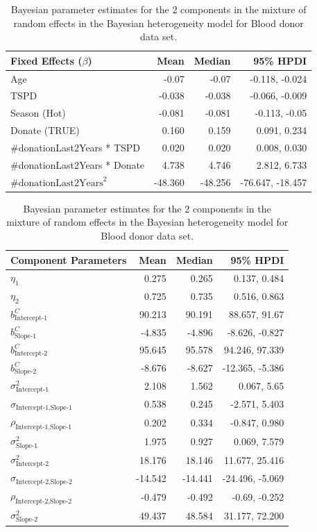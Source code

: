 \begin{table}[!htb]
\centering
\captionsetup{justification=centering}
\caption{Bayesian parameter estimates for the 2 components in the mixture of random effects in the Bayesian heterogeneity model for Blood donor data set.}
\label{table : bhtge_blooddonor_2comp}
\begin{tabular}{@{}lrrr@{}}
\toprule
Fixed Effects ($\beta$) & Mean & Median & 95\% HPDI \\ \midrule
Age &  -0.07 & -0.07 & -0.118, -0.024\\
TSPD & -0.038 & -0.038 & -0.066, -0.009\\
Season (Hot) & -0.081 & -0.081 & -0.113, -0.05\\
Donate (TRUE) & 0.160 & 0.159 & 0.091, 0.234\\
\#donationLast2Years * TSPD & 0.020 & 0.020 & 0.008, 0.030\\
\#donationLast2Years * Donate & 4.738 & 4.746 & 2.812, 6.733\\
$\text{\#donationLast2Years}^2$  & -48.360 & -48.256 & -76.647, -18.457\\ \bottomrule
\end{tabular}

\begin{tabular}{@{}lrrr@{}}
\toprule
Component Parameters & Mean & Median & 95\% HPDI \\ \midrule
$\eta_1$ & 0.275 & 0.265 & 0.137, 0.484\\
$\eta_2$ & 0.725 & 0.735 & 0.516, 0.863\\

$b_\text{Intercept-1}^C$ & 90.213 & 90.191 & 88.657, 91.67\\
$b_\text{Slope-1}^C$ & -4.835 & -4.896 & -8.626, -0.827\\

$b_\text{Intercept-2}^C$ & 95.645 & 95.578 & 94.246, 97.339\\
$b_\text{Slope-2}^C$ & -8.676 & -8.627 & -12.365, -5.386\\

$\sigma^2_\text{Intercept-1}$ & 2.108 & 1.562 & 0.067, 5.65\\
$\sigma_{\text{Intercept-1}, \text{Slope-1}}$ & 0.538 & 0.245 & -2.571, 5.403\\
$\rho_{\text{Intercept-1}, \text{Slope-1}}$ & 0.202 & 0.334 & -0.847, 0.980\\
$\sigma^2_\text{Slope-1}$ & 1.975 & 0.927 & 0.069, 7.579\\

$\sigma^2_\text{Intercept-2}$ & 18.176 & 18.146 & 11.677, 25.416\\
$\sigma_{\text{Intercept-2}, \text{Slope-2}}$ & -14.542 & -14.441 & -24.496, -5.069\\
$\rho_{\text{Intercept-2}, \text{Slope-2}}$ & -0.479 & -0.492 & -0.69, -0.252\\
$\sigma^2_\text{Slope-2}$ & 49.437 & 48.584 & 31.177, 72.200\\ \bottomrule
\end{tabular}


\end{table}

